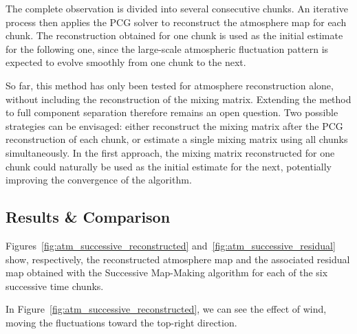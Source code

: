 \documentclass[../../thesis.tex]{subfiles}
\begin{document}
The complete observation is divided into several consecutive chunks. An iterative process then applies the PCG solver to reconstruct the atmosphere map for each chunk. The reconstruction obtained for one chunk is used as the initial estimate for the following one, since the large-scale atmospheric fluctuation pattern is expected to evolve smoothly from one chunk to the next.

So far, this method has only been tested for atmosphere reconstruction alone, without including the reconstruction of the mixing matrix. Extending the method to full component separation therefore remains an open question. Two possible strategies can be envisaged: either reconstruct the mixing matrix after the PCG reconstruction of each chunk, or estimate a single mixing matrix using all chunks simultaneously. In the first approach, the mixing matrix reconstructed for one chunk could naturally be used as the initial estimate for the next, potentially improving the convergence of the algorithm.

\subsection{Results \& Comparison}

Figures~\ref{fig:atm_successive_reconstructed} and~\ref{fig:atm_successive_residual} show, respectively, the reconstructed atmosphere map and the associated residual map obtained with the Successive Map-Making algorithm for each of the six successive time chunks.

In Figure~\ref{fig:atm_successive_reconstructed}, we can see the effect of wind, moving the fluctuations toward the top-right direction. 
\end{document}
